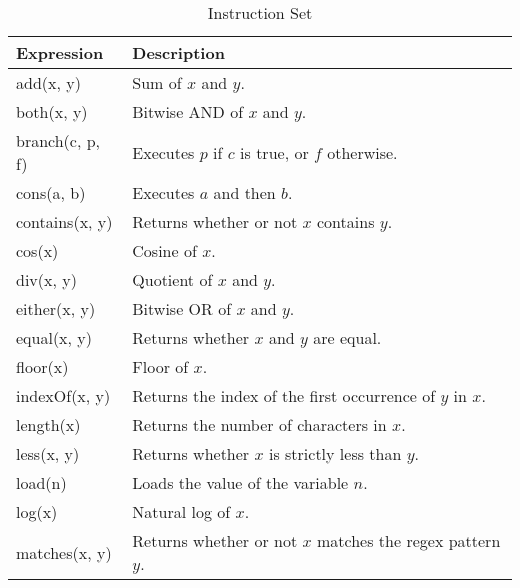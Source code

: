 \documentclass[../main.tex]{subfiles}
\begin{document}
\begin{table}[ht]
  \caption{Instruction Set}
  \centering
  \begin{tabular}{l | l}
    \hline\hline
    Expression & Description                                                                          \\
    \hline
    add(x, y)                & Sum of $x$ and $y$.                                                    \\
    both(x, y)               & Bitwise AND of $x$ and $y$.                                            \\
    branch(c, p, f)          & Executes $p$ if $c$ is true, or $f$ otherwise.                         \\
    cons(a, b)               & Executes $a$ and then $b$.                                             \\
    contains(x, y)           & Returns whether or not $x$ contains $y$.                               \\
    cos(x)                   & Cosine of $x$.                                                         \\
    div(x, y)                & Quotient of $x$ and $y$.                                               \\
    either(x, y)             & Bitwise OR of $x$ and $y$.                                             \\
    equal(x, y)              & Returns whether $x$ and $y$ are equal.                                 \\
    floor(x)                 & Floor of $x$.                                                          \\
    indexOf(x, y)            & Returns the index of the first occurrence of $y$ in $x$.               \\
    length(x)                & Returns the number of characters in $x$.                               \\
    less(x, y)               & Returns whether $x$ is strictly less than $y$.                         \\
    load(n)                  & Loads the value of the variable $n$.                                   \\
    log(x)                   & Natural log of $x$.                                                    \\
    matches(x, y)            & Returns whether or not $x$ matches the regex pattern $y$.              \\

\end{tabular}
\end{table}
\end{document}
